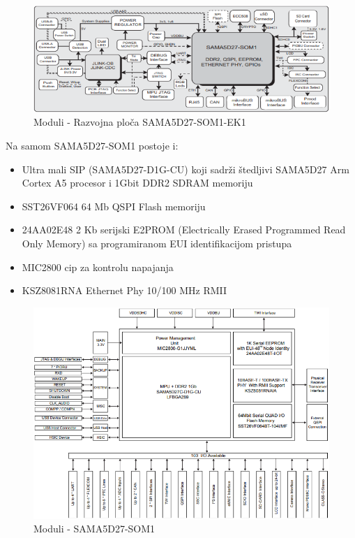 \documentclass[a4paper,12pt, master]{etf}
\begin{document}
        \begin{figure}[htb]
                \centering
                \includegraphics[scale=.7]{../pic/hw_modules.png}
                \caption{Moduli - Razvojna plo\v{c}a SAMA5D27-SOM1-EK1}
                \label{fig:hw_modules}
        \end{figure}

	Na samom SAMA5D27-SOM1 postoje i:
	\begin{itemize}
		\item Ultra mali SIP (SAMA5D27-D1G-CU) koji sadr\v{z}i \v{s}tedljivi SAMA5D27 Arm Cortex
		A5 procesor i 1Gbit DDR2 SDRAM memoriju
		\item SST26VF064 64 Mb QSPI Flash memoriju
		\item 24AA02E48 2 Kb serijski E2PROM (Electrically Erased Programmed Read Only Memory)
		sa programiranom EUI identifikacijom pristupa
		\item MIC2800 cip za kontrolu napajanja
		\item KSZ8081RNA Ethernet Phy 10/100 MHz RMII
	\end{itemize}

        \begin{figure}[htb]
                \centering
                \includegraphics[scale=.5]{../pic/hw_som_modules.PNG}
                \caption{Moduli - SAMA5D27-SOM1}
                \label{fig:hw_som_modules}
        \end{figure}
\end{document}
